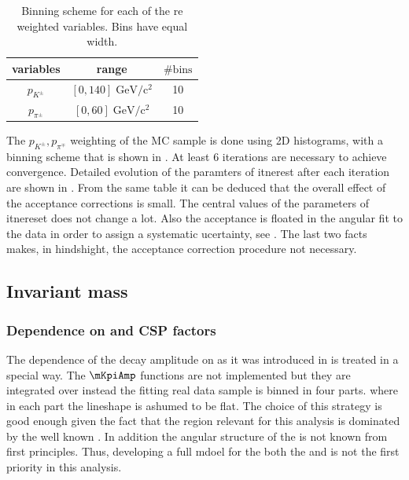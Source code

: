 \begin{table}[!h]
  \center
  \begin{tabular}{c c c}
    \hline
     variables & range & $\# \text{bins}$ \\
    \hline
    $p_{K^{\pm}}$    &  $[0,140]    \;  \text{GeV}/\text{c}^2$  & 10      \\ 
    $p_{\pi^{\pm}}$  &  $[0,60]      \;  \text{GeV}/\text{c}^2$  & 10      \\ 
    \hline
  \end{tabular}
  \caption{\small Binning scheme for each of the re weighted variables. Bins have equal width.}
  \label{angAccBinning}
\end{table}

The $p_{K^{\pm}},p_{\pi^{\mp}}$ weighting of the MC sample is done using 2D histograms, with a binning scheme that is shown in . 
At least 6 iterations are necessary to achieve convergence. Detailed evolution of the paramters of itnerest after each iteration are shown in
. From the same table it can be deduced that the overall effect of the acceptance corrections is small. The central
values of the parameters of itnereset does not change a lot. Also the acceptance is floated in the angular fit to the data in order to assign
a systematic ucertainty, see . The last two facts makes, in hindshight, the acceptance correction procedure not necessary. 


\subsection{\Kpi Invariant mass}
\label{Kpi_Invariant_mass}

\subsubsection{Dependence on \mkpi and CSP factors}
The dependence of the \BJpsiKpi decay amplitude on \mkpi as it was introduced in  is treated in a special way.
The $\mKpiAmp$ functions are not implemented but they are integrated over \mkpi instead the fitting real data sample is binned in four parts.
where in each part the \mkpi lineshape is ashumed to be flat.
The choice of this strategy is good enough given the fact that the \mkpi region relevant for this analysis is dominated by the well
known \pwave. In addition the angular structure of the \swave is not known from first principles. Thus, developing a full mdoel for the both
the \pwave and \swave is not the first priority in this analysis.

